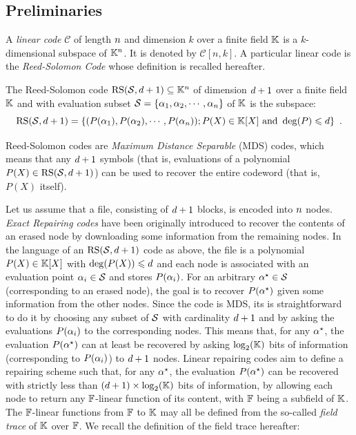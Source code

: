 \documentclass{llncs}
\begin{document}
\subsection{Preliminaries}

A {\em linear code} $\mathcal{C}$ of length $\nbShares$ and dimension $k$ over a finite field $\Field$ is a $k$-dimensional subspace of $\Field^{\nbShares}$. It is denoted by $\mathcal{C}[n,k]$. A particular linear code is the {\em Reed-Solomon Code} whose definition is recalled hereafter.

\begin{definition}
The Reed-Solomon code $\RS[\pubSet, \order + 1]\subseteq \Field^{\nbShares}$ of dimension $\order + 1$ over a finite field $\Field$ and with evaluation subset $\pubSet = \{\pubElt[1],\pubElt[2],\cdots,\pubElt[\nbShares]\}$ of $\Field$ is the subspace:
$$\RS[\pubSet,\order + 1] = \{(P(\pubElt[1]),P(\pubElt[2]),\cdots,P(\pubElt[\nbShares])); P(X) \in \Field[X] \text{ and } \deg(P) \leqslant \order\} \enspace .$$
\end{definition}

Reed-Solomon codes are {\em Maximum Distance Separable} (MDS) codes, which means that any $\order + 1$ symbols (that is, evaluations of a polynomial $P(X)\in \RS[\pubSet,\order+1]$) can be used to recover the entire codeword (that is,
$P(X)$ itself).
\vspace{3mm}

Let us assume that a file, consisting of $\order + 1$ blocks, is encoded into $\nbShares$ nodes. {\em Exact Repairing codes} have been originally introduced to recover the contents of an erased node by downloading some information from the remaining nodes. In the language of an $\RS[\pubSet,\order+1]$ code as above, the file is a polynomial $P(X)\in \Field[X]$ with $\deg(P(X)) \leqslant \order$ and each node is associated with an evaluation point $\pubElt \in \pubSet$ and stores $P(\pubElt)$. For an arbitrary $\pubEltStar\in \pubSet$ (corresponding to an erased node), the goal is to recover $P(\pubEltStar)$ given some information from the other nodes. Since the code is MDS, its is straightforward to do it by choosing any subset of $\pubSet$ with cardinality $\order + 1$ and by asking the evaluations $P(\pubElt)$ to the corresponding nodes. This means that, for any $\pubEltStar$, the evaluation $P(\pubEltStar)$ can at least be recovered by asking $\log_2(\Field)$ bits of information (corresponding to $P(\pubElt)$) to $\order +1$ nodes. Linear repairing codes aim to define a repairing scheme such that, for any $\pubEltStar$, the evaluation $P(\pubEltStar)$ can be recovered with strictly less than $(\order + 1)\times \log_2(\Field)$ bits of information, by allowing each node to return any $\FField$-linear function of its content, with $\FField$ being a subfield of $\Field$. The $\FField$-linear functions from $\FField$ to $\Field$ may all be defined from the so-called {\em field trace} of $\Field$ over $\FField$. We recall the definition of the field trace hereafter:
\end{document}

